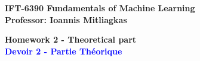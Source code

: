 \documentclass[11pt,french,english]{article}
\begin{document}
\setlength{\parskip}{0.3cm} \setlength{\parindent}{0cm}

\begin{center}
\textbf{IFT-6390 Fundamentals of Machine Learning} \\
\textbf{Professor: Ioannis Mitliagkas }
\par\end{center}{\large \par}

\begin{center}
\textbf{\LARGE{Homework 2 - Theoretical part}} \\
\textbf{\textcolor{blue}{Devoir 2 - Partie Th\'eorique}}
\par\end{center}{\LARGE \par}


%


%


%
\end{document}
